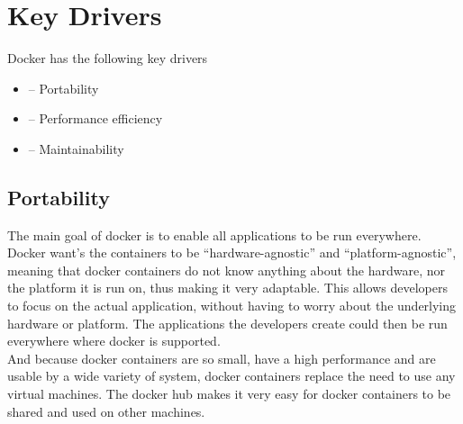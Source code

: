
\section{Key Drivers}
\label{sec:keydrivers}

Docker has the following key drivers
\begin{itemize}
	\item {}-- Portability
	\item {}-- Performance efficiency
	\item {}-- Maintainability
\end{itemize}
%
\subsection{Portability}
%

%



The main goal of docker is to enable all applications to be run everywhere. Docker want's the containers to be ``hardware-agnostic'' and ``platform-agnostic'', meaning that docker containers do not know anything about the hardware, nor the platform it is run on, thus making it very adaptable. This allows developers to focus on the actual application, without having to worry about the underlying hardware or platform. The applications the developers create could then be run everywhere where docker is supported.\\
And because docker containers are so small, have a high performance and are usable by a wide variety of system, docker containers replace the need to use any virtual machines.
 The docker hub makes it very easy for docker containers to be shared and used on other machines.

